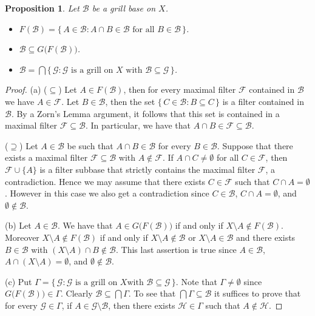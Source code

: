 \documentclass[12pt]{article}
\theoremstyle{plain}
\newtheorem{prop}[thm]{Proposition}
\theoremstyle{definition}
\newcommand{\calB}{\mathcal{B}}
\newcommand{\calF}{\mathcal{F}}
\newcommand{\calG}{\mathcal{G}}
\newcommand{\calH}{\mathcal{H}}
\begin{document}
\begin{prop}
  Let $\calB$ be a grill base on $X$.
  \begin{itemize}
    \item[(a)] $F(\calB) = \{\, A \in \calB : A \cap B \in \calB
      \mbox{ for all } B \in \calB \,\}$.

    \item[(b)] $\calB \subseteq G\bigl(F(\calB)\bigr)$.

    \item[(c)] $\calB = \bigcap\{\, \calG : \calG \mbox{ is a grill on }
      X \mbox{ with } \calB \subseteq \calG \,\}$.
  \end{itemize}
\end{prop}
\begin{proof}
  (a) ($\subseteq$) Let $A \in F(\calB)$, then for every maximal
  filter $\calF$ contained in $\calB$ we have $A \in \calF$.
  Let $B \in \calB$, then the set $\{\, C \in \calB : B \subseteq
  C\,\}$ is a filter contained in $\calB$. 
  By a Zorn's Lemma argument, it follows that this set is contained in
  a maximal filter $\calF \subseteq \calB$.
  In particular, we have that $A \cap B \in \calF \subseteq \calB$.
  
  ($\supseteq$) Let $A \in \calB$ be such that $A \cap B \in \calB$
  for every $B \in \calB$.
  Suppose that there exists a maximal filter $\calF \subseteq \calB$
  with $A \not\in \calF$. 
  If $A \cap C \ne \emptyset$ for all $C \in \calF$, then $\calF \cup
  \{A\}$ is a filter subbase that strictly contains the maximal filter
  $\calF$, a contradiction.
  Hence we may assume that there exists $C \in \calF$ such that $C
  \cap A = \emptyset$. 
  However in this case we also get a contradiction since $C \in \calB$,
  $C \cap A = \emptyset$, and $\emptyset \not\in \calB$.

  (b) Let $A \in \calB$.
  We have that $A \in G\bigl(F(\calB)\bigr)$ if and only if $X
  \setminus A \not\in F(\calB)$.
  Moreover $X \setminus A \not\in F(\calB)$ if and only if $X \setminus A
  \not\in \calB$ or $X \setminus A \in \calB$ and there exists $B \in
  \calB$ with $(X \setminus A) \cap B \not\in \calB$.
  This last assertion is true since $A \in \calB$, $A \cap (X
  \setminus A) = \emptyset$, and $\emptyset \not\in \calB$.
  
  (c)
  Put $\Gamma = \{\, \calG : \calG \mbox{ is a grill on } X \mbox{
    with } \calB \subseteq \calG \,\}$.
  Note that $\Gamma \ne \emptyset$ since $G\bigl(F(\calB)\bigr) \in
  \Gamma$.
  Clearly $\calB \subseteq \bigcap\Gamma$.
  To see that $\bigcap\Gamma \subseteq \calB$ it suffices to prove
  that for every $\calG \in \Gamma$, if $A \in \calG \setminus \calB$,
  then there exists $\calH \in \Gamma$ such that $A \not\in \calH$.


\end{proof}
\end{document}
